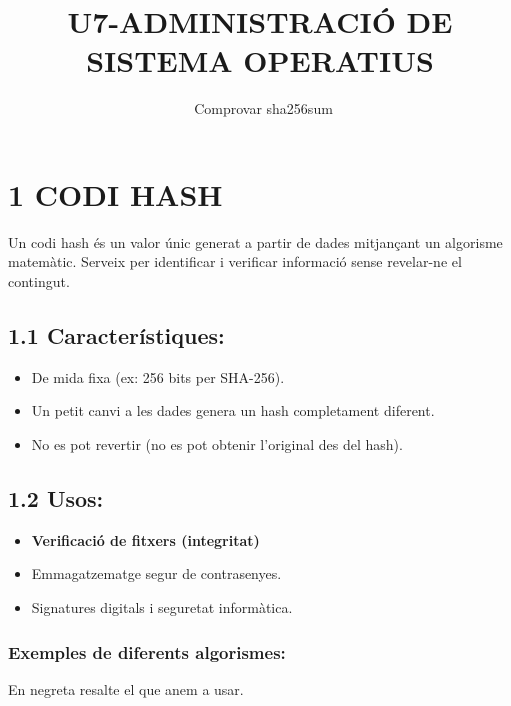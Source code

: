 \documentclass[
  12 pt,
  a4paper,
]{article}
\title{U7-ADMINISTRACIÓ DE SISTEMA OPERATIUS}
\subtitle{~Comprovar sha256sum}
\author{}
\date{\vspace{-2.5em}}
\begin{document}
\maketitle

\section{1 CODI HASH}\label{codi-hash}

Un codi hash és un valor únic generat a partir de dades mitjançant un
algorisme matemàtic. Serveix per identificar i verificar informació
sense revelar-ne el contingut.

\subsection{1.1 Característiques:}\label{caracteruxedstiques}

\begin{itemize}
\item
  De mida fixa (ex: 256 bits per SHA-256).
\item
  Un petit canvi a les dades genera un hash completament diferent.
\item
  No es pot revertir (no es pot obtenir l'original des del hash).
\end{itemize}

\subsection{1.2 Usos:}\label{usos}

\begin{itemize}
\item
  \textbf{Verificació de fitxers (integritat)}
\item
  Emmagatzematge segur de contrasenyes.
\item
  Signatures digitals i seguretat informàtica.
\end{itemize}

\subsubsection{Exemples de diferents
algorismes:}\label{exemples-de-diferents-algorismes}

En negreta resalte el que anem a usar.
\end{document}
